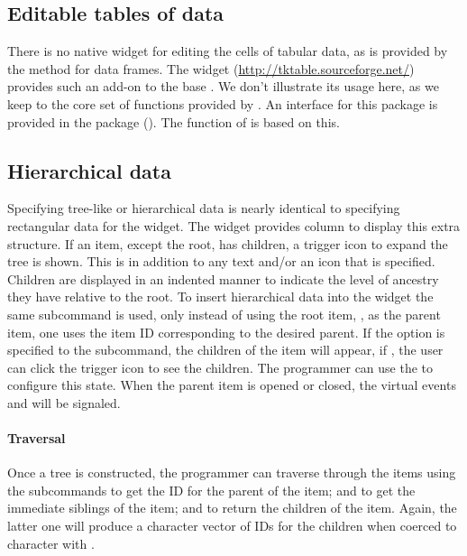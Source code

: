 
\subsection{Editable tables of data}
\label{sec:editable-tables-data}

There is no native widget for editing the cells of tabular data, as is
provided by the  method for data frames. The
 widget (\url{http://tktable.sourceforge.net/}) provides
such an add-on to the base \TK. We don't illustrate its usage here, as
we keep to the core set of functions provided by \TK.  An interface
for this \TCL\/ package is provided in the  package
().  The  function of 
is based on this.



\subsection{Hierarchical data}

Specifying tree-like or hierarchical data is nearly identical to
specifying rectangular data for the  widget.  The
widget provides column  to display this extra structure. If
an item, except the root, has children, a trigger icon to expand the
tree is shown. This is in addition to any text and/or an icon that is
specified. Children are displayed in an indented manner to indicate
the level of ancestry they have relative to the root.  To insert
hierarchical data into the widget the same
 subcommand is used, only instead of
using the root item, \qcode{}, as the parent item, one uses the item
ID corresponding to the desired parent. If the option 
is specified to the  subcommand, the children of the item
will appear, if , the user can click the trigger icon to
see the children. The programmer can use the
 to configure this state. When the
parent item is opened or closed, the virtual events
 and  will be
signaled.



\paragraph{Traversal}
Once a tree is constructed, the programmer can traverse
through the items using the subcommands
 to get the ID for the parent of the
item;  and
 to get the immediate siblings of the
item; and  to return the children of
the item. Again, the latter one will produce a character vector of  IDs for the
children when coerced to character with .



